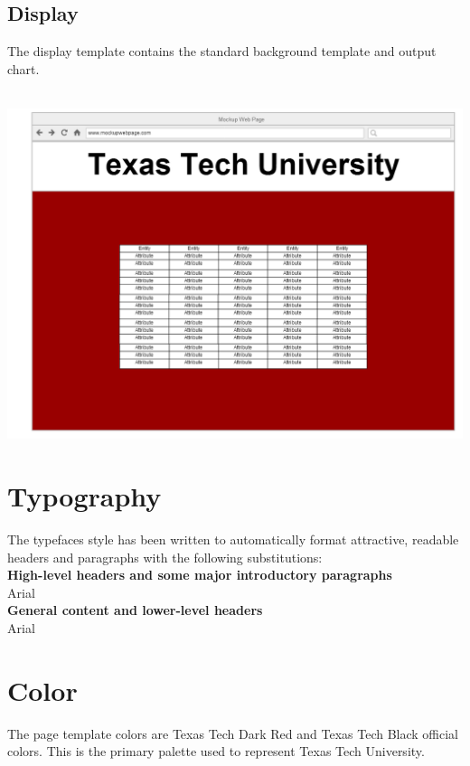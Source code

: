 \documentclass[12pt]{exam}
\begin{document}
\subsection{Display}
The display template contains the standard background template and output chart.
\begin{center}
\emph{\\}\includegraphics[scale=0.20]{display.PNG}\\
\end{center}

\section{Typography}
The typefaces style has been written to automatically format attractive, readable headers and paragraphs with the following substitutions:\\

\noindent\textbf{High-level headers and some major introductory paragraphs}\\
Arial\\

\noindent\textbf{General content and lower-level headers}\\
Arial

\section{Color}
The page template colors are Texas Tech Dark Red and Texas Tech Black official colors. This is the primary palette used to represent Texas Tech University.	
\end{document}
